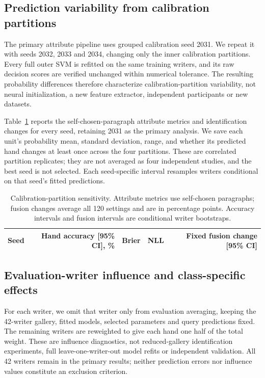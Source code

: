\documentclass[10pt,a4paper]{article}
\begin{document}
\subsection{Prediction variability from calibration partitions}
The primary attribute pipeline uses grouped calibration seed 2031. We repeat it with seeds 2032, 2033 and 2034, changing only the inner calibration partitions. Every full outer SVM is refitted on the same training writers, and its raw decision scores are verified unchanged within numerical tolerance. The resulting probability differences therefore characterize calibration-partition variability, not neural initialization, a new feature extractor, independent participants or new datasets.

Table~\ref{tab:seeddiag} reports the self-chosen-paragraph attribute metrics and identification changes for every seed, retaining 2031 as the primary analysis. We save each unit's probability mean, standard deviation, range, and whether its predicted hand changes at least once across the four partitions. These are correlated partition replicates; they are not averaged as four independent studies, and the best seed is not selected. Each seed-specific interval resamples writers conditional on that seed's fitted predictions.

\begin{table}[ht]
\centering\small
\caption{Calibration-partition sensitivity. Attribute metrics use self-chosen paragraphs; fusion changes average all 120 settings and are in percentage points. Accuracy intervals and fusion intervals are conditional writer bootstraps.}\label{tab:seeddiag}
\begin{tabular}{rrrrr}\toprule
Seed & Hand accuracy [95\% CI], \% & Brier & NLL & Fixed fusion change [95\% CI]\\\midrule

\end{tabular}
\end{table}

\subsection{Evaluation-writer influence and class-specific effects}
For each writer, we omit that writer only from evaluation averaging, keeping the 42-writer gallery, fitted models, selected parameters and query predictions fixed. The remaining writers are reweighted to give each hand one half of the total weight. These are influence diagnostics, not reduced-gallery identification experiments, full leave-one-writer-out model refits or independent validation. All 42 writers remain in the primary results; neither prediction errors nor influence values constitute an exclusion criterion.
\end{document}
